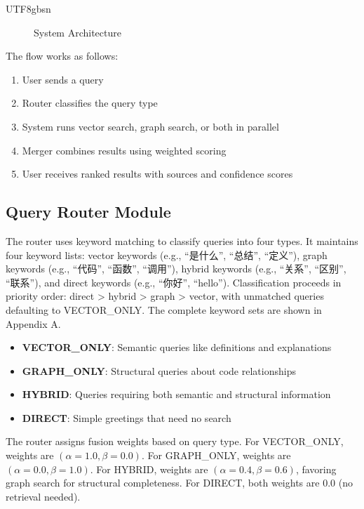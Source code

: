 \documentclass[11pt]{article}
\begin{document}
\begin{CJK*}{UTF8}{gbsn}
\begin{figure}[htbp]
\begin{tikzpicture}[
    node distance=1.5cm and 2cm,
    block/.style={rectangle, draw, text width=3cm, text centered, minimum height=1cm, rounded corners},
    arrow/.style={->, >=Stealth, thick}
]
\end{tikzpicture}
\caption{System Architecture}
\label{fig:architecture}
\end{figure}

The flow works as follows:

\begin{enumerate}
    \item User sends a query
    \item Router classifies the query type
    \item System runs vector search, graph search, or both in parallel
    \item Merger combines results using weighted scoring
    \item User receives ranked results with sources and confidence scores
\end{enumerate}

\subsection{Query Router Module}
The router uses keyword matching to classify queries into four types. It maintains four keyword lists: vector keywords (e.g., ``是什么'', ``总结'', ``定义''), graph keywords (e.g., ``代码'', ``函数'', ``调用''), hybrid keywords (e.g., ``关系'', ``区别'', ``联系''), and direct keywords (e.g., ``你好'', ``hello''). Classification proceeds in priority order: direct > hybrid > graph > vector, with unmatched queries defaulting to VECTOR\_ONLY. The complete keyword sets are shown in Appendix A.

\begin{itemize}
    \item \textbf{VECTOR\_ONLY}: Semantic queries like definitions and explanations
    \item \textbf{GRAPH\_ONLY}: Structural queries about code relationships
    \item \textbf{HYBRID}: Queries requiring both semantic and structural information
    \item \textbf{DIRECT}: Simple greetings that need no search
\end{itemize}

The router assigns fusion weights based on query type. For VECTOR\_ONLY, weights are $(\alpha=1.0, \beta=0.0)$. For GRAPH\_ONLY, weights are $(\alpha=0.0, \beta=1.0)$. For HYBRID, weights are $(\alpha=0.4, \beta=0.6)$, favoring graph search for structural completeness. For DIRECT, both weights are 0.0 (no retrieval needed).


\end{CJK*}
\end{document}
